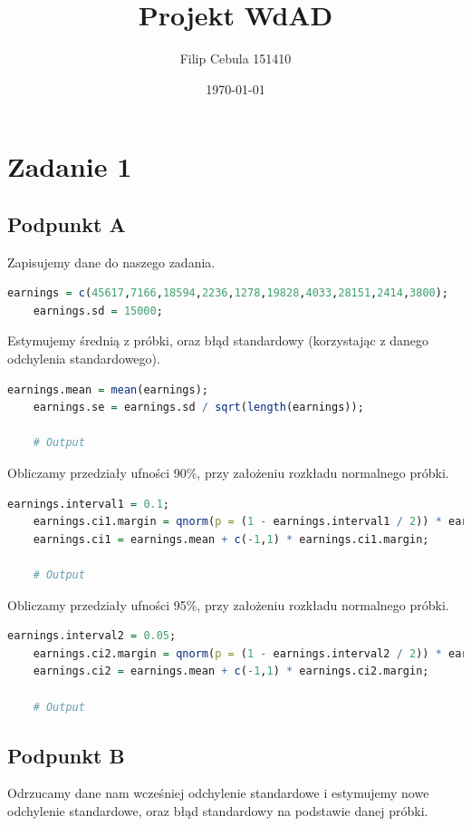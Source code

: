 \documentclass[11pt]{article}
\title{Projekt WdAD}
\author{Filip Cebula 151410}
\date{\today}
\begin{document}
\maketitle
\pagebreak

\section{Zadanie 1}
\subsection{Podpunkt A}
Zapisujemy dane do naszego zadania.

\begin{lstlisting}[language=R]
    earnings = c(45617,7166,18594,2236,1278,19828,4033,28151,2414,3800);
    earnings.sd = 15000;
\end{lstlisting}

Estymujemy średnią z próbki, oraz błąd standardowy (korzystając z danego odchylenia standardowego).

\begin{lstlisting}[language=R]
    earnings.mean = mean(earnings);
    earnings.se = earnings.sd / sqrt(length(earnings));

    # Output
\end{lstlisting}

Obliczamy przedziały ufności 90\%, przy założeniu rozkładu normalnego próbki.

\begin{lstlisting}[language=R]
    earnings.interval1 = 0.1;
    earnings.ci1.margin = qnorm(p = (1 - earnings.interval1 / 2)) * earnings.se;
    earnings.ci1 = earnings.mean + c(-1,1) * earnings.ci1.margin;

    # Output
\end{lstlisting}

Obliczamy przedziały ufności 95\%, przy założeniu rozkładu normalnego próbki.

\begin{lstlisting}[language=R]
    earnings.interval2 = 0.05;
    earnings.ci2.margin = qnorm(p = (1 - earnings.interval2 / 2)) * earnings.se;
    earnings.ci2 = earnings.mean + c(-1,1) * earnings.ci2.margin;

    # Output
\end{lstlisting}

\pagebreak

\subsection{Podpunkt B}
Odrzucamy dane nam wcześniej odchylenie standardowe i estymujemy nowe odchylenie standardowe,
oraz błąd standardowy na podstawie danej próbki.
\end{document}
